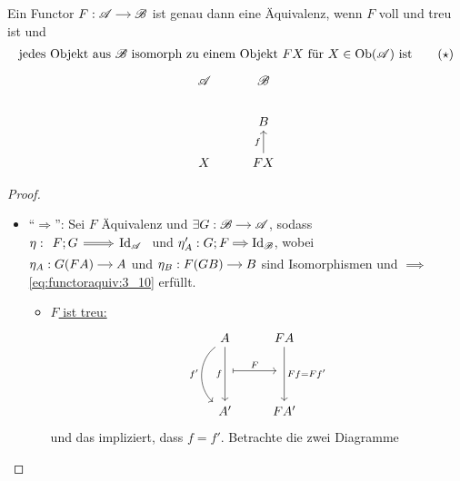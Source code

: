 \begin{satz}
	Ein Functor $F: \begin{tikzcd}[cramped, sep=small]
	 \CatA \arrow[r] &\CatB
	\end{tikzcd}$ ist genau dann eine Äquivalenz, wenn $F$ voll und treu ist und
	\begin{align*}
		\text{jedes Objekt aus $\mathscr B$ isomorph zu einem Objekt $FX$ für $X \in \operatorname{Ob}(\mathscr A)$ ist} \label{eq:functoraquiv:3_10}\tag{$\star$}
	\end{align*}
	\[
	\begin{tikzcd}
		\CatA & \CatB \\
		& B\\
		X & FX \arrow[u, "f"]
	\end{tikzcd}
	\]
\end{satz}
\begin{proof}
	\begin{itemize} %
		\item ``$\Rightarrow$'': Sei $F$ Äquivalenz und $\exists G: \begin{tikzcd}[cramped, sep=small]
		\CatB \arrow[r] & \CatA
		\end{tikzcd}$, sodass \\$\eta: \begin{tikzcd}
		F; G \nattrans{r}{Rightarrow} & \id_{\CatA}
		\end{tikzcd}$ und 
		$\eta'_A : \begin{tikzcd}[cramped, sep=small]
		G; F \nattrans{r}{Rightarrow} & \id_{\CatB}
		\end{tikzcd}$, wobei \\$\eta_A: \begin{tikzcd}[cramped, sep=small]
		G(FA) \arrow[r] & A
		\end{tikzcd}$ und $\eta_B: \begin{tikzcd}[cramped, sep=small]
			F(GB) \arrow[r] & B
		\end{tikzcd}$ sind Isomorphismen und $\implies$ \eqref{eq:functoraquiv:3_10} erfüllt.
		\begin{itemize}
			\item \ul{$F$ ist treu:}
			\[
			\begin{tikzcd}
			A \arrow[dd, bend right=50, "{f'}"']\arrow[dd, "f"'] & FA \arrow[dd, "{Ff = Ff'}"] \\
			\ \arrow[r, maps to, "F"]& \ \\
			A' & FA'
			\end{tikzcd}
			\] und das impliziert, dass $f = f'$. Betrachte die zwei Diagramme

\end{itemize}
\end{itemize}
\end{proof}
